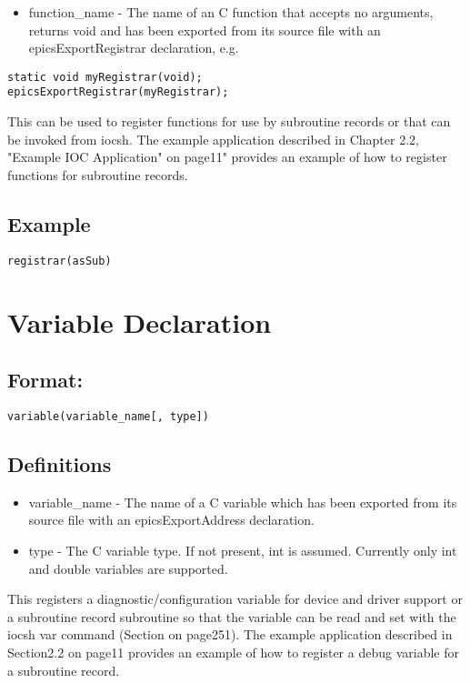 \begin{itemize}\item {}function\_name - The name of an C function that accepts no arguments, returns void and has been exported from 
its source file with an epicsExportRegistrar declaration, e.g.

\end{itemize}\begin{verbatim}
static void myRegistrar(void);
epicsExportRegistrar(myRegistrar);
\end{verbatim}This can be used to register functions for use by subroutine records or that can be invoked from iocsh. The example 
application described in Chapter 2.2, "Example IOC Application" on page11" provides an example of how to register 
functions for subroutine records.

\subsection{Example}

\begin{verbatim}registrar(asSub)
\end{verbatim}\section{Variable Declaration}

\subsection{Format:}

\begin{verbatim}variable(variable_name[, type])
\end{verbatim}\subsection{Definitions}

\begin{itemize}\item {}variable\_name - The name of a C variable which has been exported from its source file with an 
epicsExportAddress declaration.

\item {}type - The C variable type.  If not present, int is assumed.  Currently only int and double  variables are supported.

\end{itemize}This registers a diagnostic/configuration variable for device and driver support or a subroutine record subroutine so that 
the variable can be read and set with the iocsh var command (Section on page251). The example application described in 
Section2.2 on page11 provides an example of how to register a debug variable for a subroutine record.

